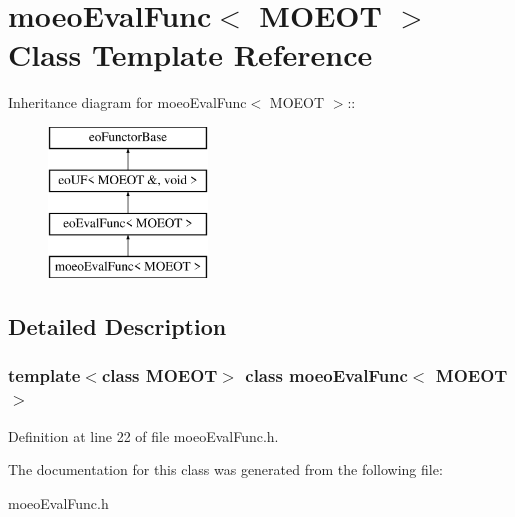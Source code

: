 \section{moeo\-Eval\-Func$<$ MOEOT $>$ Class Template Reference}
\label{classmoeoEvalFunc}
Inheritance diagram for moeo\-Eval\-Func$<$ MOEOT $>$::\begin{figure}[H]
\begin{center}
\leavevmode
\includegraphics[height=4cm]{classmoeoEvalFunc}
\end{center}
\end{figure}


\subsection{Detailed Description}
\subsubsection*{template$<$class MOEOT$>$ class moeo\-Eval\-Func$<$ MOEOT $>$}





Definition at line 22 of file moeo\-Eval\-Func.h.

The documentation for this class was generated from the following file:\begin{CompactItemize}
\item 
moeo\-Eval\-Func.h\end{CompactItemize}
